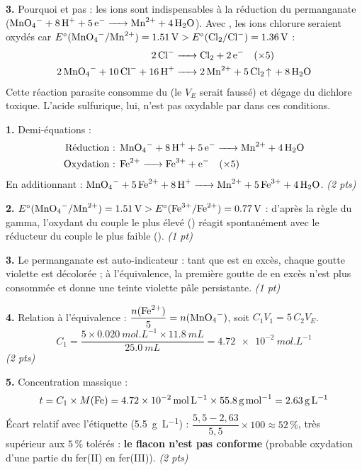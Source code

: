 \documentclass[11pt]{article}
\begin{document}
\begin{corrige}
\textbf{3.} Pourquoi  et pas  : les ions  sont indispensables à la réduction du permanganate ($\ce{MnO4- + 8H+ + 5e- -> Mn^2+ + 4H2O}$). Avec , les ions chlorure seraient oxydés car $E^\circ(\ce{MnO4-}/\ce{Mn^2+}) = \SI{1,51}{V} > E^\circ(\ce{Cl2}/\ce{Cl-}) = \SI{1,36}{V}$ :
\begin{align*}
\ce{2Cl- &-> Cl2 + 2e-} \quad (\times 5)\\
\ce{2MnO4- + 10Cl- + 16H+ &-> 2Mn^2+ + 5Cl2 ^ + 8H2O}
\end{align*}
Cette réaction parasite consomme du  (le $V_E$ serait faussé) et dégage du dichlore toxique. L'acide sulfurique, lui, n'est pas oxydable par  dans ces conditions.
\end{corrige}

\begin{corrige}
\textbf{1.} Demi-équations :
\begin{align*}
\text{Réduction : } & \ce{MnO4- + 8H+ + 5e- -> Mn^2+ + 4H2O} \\
\text{Oxydation : } & \ce{Fe^2+ -> Fe^3+ + e-} \quad (\times 5)
\end{align*}
En additionnant : $\ce{MnO4- + 5Fe^2+ + 8H+ -> Mn^2+ + 5Fe^3+ + 4H2O}$. \hfill \emph{(2 pts)}

\textbf{2.} $E^\circ(\ce{MnO4-}/\ce{Mn^2+}) = \SI{1,51}{V} > E^\circ(\ce{Fe^3+}/\ce{Fe^2+}) = \SI{0,77}{V}$ : d'après la règle du gamma, l'oxydant du couple le plus élevé () réagit spontanément avec le réducteur du couple le plus faible (). \hfill \emph{(1 pt)}

\textbf{3.} Le permanganate est auto-indicateur : tant que  est en excès, chaque goutte violette est décolorée ; à l'équivalence, la première goutte de  en excès n'est plus consommée et donne une teinte violette pâle persistante. \hfill \emph{(1 pt)}

\textbf{4.} Relation à l'équivalence : $\dfrac{n(\ce{Fe^2+})}{5} = n(\ce{MnO4-})$, soit $C_1 V_1 = 5\, C_2 V_E$.
\[ C_1 = \frac{5 \times \SI{0,020}{mol.L^{-1}} \times \SI{11,8}{mL}}{\SI{25,0}{mL}} = \SI{4,72e-2}{mol.L^{-1}} \]
\hfill \emph{(2 pts)}

\textbf{5.} Concentration massique :
\[ t = C_1 \times M(\ce{Fe}) = \SI{4,72e-2}{mol.L^{-1}} \times \SI{55,8}{g.mol^{-1}} = \SI{2,63}{g.L^{-1}} \]
Écart relatif avec l'étiquette (\SI{5,5}{g.L^{-1}}) : $\dfrac{5,5 - 2,63}{5,5} \times 100 \approx 52\,\%$, très supérieur aux $5\,\%$ tolérés : \textbf{le flacon n'est pas conforme} (probable oxydation d'une partie du fer(II) en fer(III)). \hfill \emph{(2 pts)}


\end{corrige}
\end{document}
